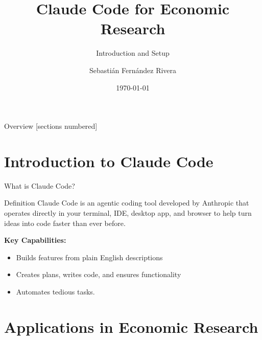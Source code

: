 \documentclass[9pt]{beamer}
\title{Claude Code for Economic Research}
\subtitle{Introduction and Setup}
\author{Sebastián Fernández Rivera}
\date{\today}
\begin{document}
	
	\maketitle
	
	\begin{frame}{Overview}
		[sections numbered]
		\tableofcontents
	\end{frame}
	
	\section{Introduction to Claude Code}
	
	\begin{frame}{What is Claude Code?}
		\begin{block}{Definition}
			Claude Code is an \alert{agentic coding tool} developed by Anthropic that operates directly in your terminal, IDE, desktop app, and browser to help turn ideas into code faster than ever before.
		\end{block}
		
		\vspace{0.5cm}
		
		\textbf{Key Capabilities:}
		\begin{itemize}
			\item Builds features from plain English descriptions
			\item Creates plans, writes code, and ensures functionality
			\item Automates tedious tasks.
		\end{itemize}
	\end{frame}
	
	\section{Applications in Economic Research}
	
\end{document}
